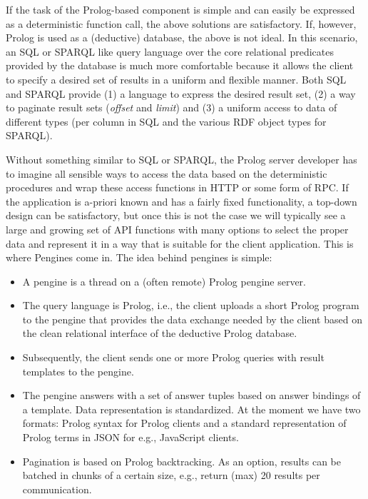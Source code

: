 \documentclass{new_tlp}
\begin{document}
If the task of the Prolog-based component is simple and can easily be
expressed as a deterministic function call, the above solutions are
satisfactory. If, however, Prolog is used as a (deductive) database, the
above is not ideal. In this scenario, an SQL or SPARQL like query
language over the core relational predicates provided by the database is
much more comfortable because it allows the client to specify a desired
set of results in a uniform and flexible manner. Both SQL and SPARQL
provide (1) a language to express the desired result set, (2) a way to
paginate result sets (\textit{offset} and \textit{limit}) and (3) a
uniform access to data of different types (per column in SQL and the
various RDF object types for SPARQL).

Without something similar to SQL or SPARQL, the Prolog server developer
has to imagine all sensible ways to access the data based on the
deterministic procedures and wrap these access functions in HTTP or some
form of RPC. If the application is a-priori known and has a fairly fixed
functionality, a top-down design can be satisfactory, but once this is
not the case we will typically see a large and growing set of API
functions with many options to select the proper data and represent it
in a way that is suitable for the client application. This is where
Pengines come in. The idea behind pengines is simple:

\begin{itemize}
    \item A pengine is a thread on a (often remote) Prolog pengine
	  server.
    \item The query language is Prolog, i.e., the client uploads a
	  short Prolog program to the pengine that provides the data
	  exchange needed by the client based on the clean relational
	  interface of the deductive Prolog database.
    \item Subsequently, the client sends one or more Prolog queries
          with result templates to the pengine.
    \item The pengine answers with a set of answer tuples based on
	  answer bindings of a template.  Data representation is
	  standardized.  At the moment we have two formats:
	  Prolog syntax for Prolog clients and a standard representation
	  of Prolog terms in JSON for e.g., JavaScript clients.
    \item Pagination is based on Prolog backtracking.  As an option,
          results can be batched in chunks of a certain size, e.g.,
	  return (max) 20 results per communication.
\end{itemize}
\end{document}
